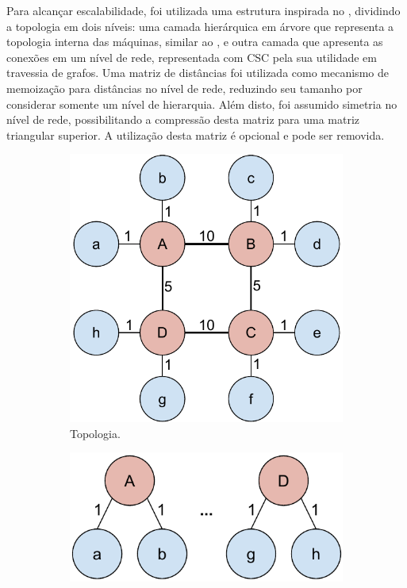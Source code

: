 Para alcançar escalabilidade, foi utilizada uma estrutura inspirada no \netloc, dividindo a topologia em dois níveis: uma camada hierárquica em árvore que representa a topologia interna das máquinas, similar ao \hwloc, e outra camada que apresenta as conexões em um nível de rede, representada com CSC pela sua utilidade em travessia de grafos. 
Uma matriz de distâncias foi utilizada como mecanismo de memoização para distâncias no nível de rede, reduzindo seu tamanho por considerar somente um nível de hierarquia. 
Além disto, foi assumido simetria no nível de rede, possibilitando a compressão desta matriz para uma matriz triangular superior.
A utilização desta matriz é opcional e pode ser removida.

\begin{figure}[t]
\begin{subfigure}{.5\textwidth}
    \centering
    \includegraphics[width=0.8\linewidth]{images/estrutura_abst_topo.pdf}
    \caption{Topologia.}
    \label{fig:estru:topo}
\end{subfigure}
\begin{subfigure}{.5\textwidth}
    \centering
    \includegraphics[width=0.8\linewidth]{images/estrutura_abst_arvore.pdf}

\end{subfigure}
\end{figure}
